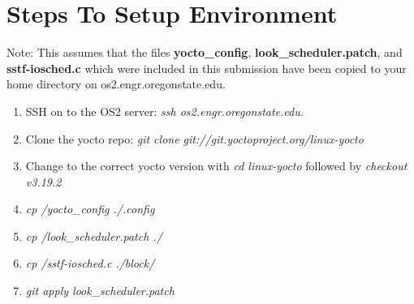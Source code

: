 \documentclass[onecolumn,draftclsnofoot, 10pt, compsoc]{IEEEtran}
\begin{document}
\section{Steps To Setup Environment}
	Note: This assumes that the files \textbf{yocto\_config}, \textbf{look\_scheduler.patch}, and \textbf{sstf-iosched.c} which were included in this submission have been copied to your home directory on os2.engr.oregonstate.edu.
	\begin{enumerate}
		\item
			SSH on to the OS2 server: \textit{ssh os2.engr.oregonstate.edu. }
		\item
			Clone the yocto repo: \textit{git clone git://git.yoctoproject.org/linux-yocto}
		\item 
			Change to the correct yocto version with \textit{cd linux-yocto} followed by \textit{checkout v3.19.2}
		\item 
			\textit{cp \texttildelow/yocto\_config ./.config}
		\item 
			\textit{cp \texttildelow/look\_scheduler.patch ./}
		\item 
			\textit{cp \texttildelow/sstf-iosched.c ./block/}
		\item 
			\textit{git apply look\_scheduler.patch}
	\end{enumerate}
\end{document}

